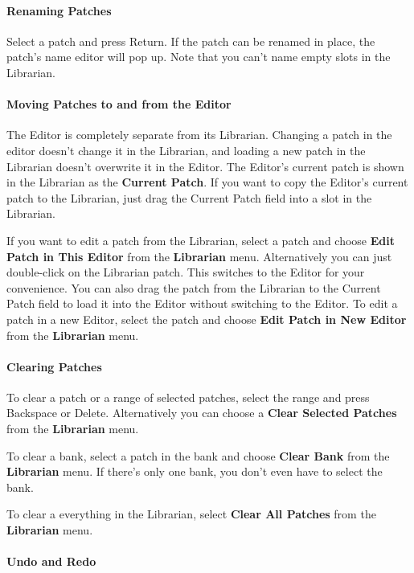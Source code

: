 \documentclass{article}
\begin{document}
\paragraph{Renaming Patches}  Select a patch and press Return.  If the patch can be renamed in place, the patch's name editor will pop up.  Note that you can't name empty slots in the Librarian.

\paragraph{Moving Patches to and from the Editor}

The Editor is completely separate from its Librarian.  Changing a patch in the editor doesn't change it in the Librarian, and loading a new patch in the Librarian doesn't overwrite it in the Editor.   The Editor's current patch is shown in the Librarian as the {\bf Current Patch}.  If you want to copy the Editor's current patch to the Librarian, just drag the Current Patch field into a slot in the Librarian.  

If you want to edit a patch from the Librarian, select a patch and choose {\bf Edit Patch in This Editor} from the {\bf Librarian} menu.  Alternatively you can just double-click on the Librarian patch.  This switches to the Editor for your convenience.  You can also drag the patch from the Librarian to the Current Patch field to load it into the Editor without switching to the Editor.  To edit a patch in a new Editor, select the patch and choose {\bf Edit Patch in New Editor} from the {\bf Librarian} menu.

\paragraph{Clearing Patches}

To clear a patch or a range of selected patches, select the range and press Backspace or Delete.  Alternatively you can choose a {\bf Clear Selected Patches} from the {\bf Librarian} menu.  

To clear a bank, select a patch in the bank and choose {\bf Clear Bank} from the {\bf Librarian} menu.  If there's only one bank, you don't even have to select the bank.

To clear a everything in the Librarian, select {\bf Clear All Patches} from the {\bf Librarian} menu.

\paragraph{Undo and Redo}
\end{document}
